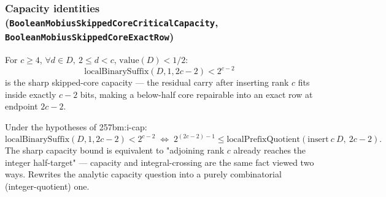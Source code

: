 \subsubsection*{Capacity identities (\texttt{BooleanMobiusSkippedCoreCriticalCapacity}, \texttt{BooleanMobiusSkippedCoreExactRow})}

\begin{defn}
For $c\ge4$, $\forall d\in D,\ 2\le d<c$, $\mathrm{value}(D)<1/2$:
\[
\mathrm{localBinarySuffix}(D,1,2c-2) < 2^{c-2}
\]
is the sharp skipped-core capacity — the residual carry after inserting rank $c$ fits inside
exactly $c-2$ bits, making a below-half core repairable into an exact row at endpoint $2c-2$.
\par\noindent{}   
\end{defn}

\begin{thm}
Under the hypotheses of 257bm:i-cap:
\[
\mathrm{localBinarySuffix}(D,1,2c-2) < 2^{c-2} \;\Longleftrightarrow\; 2^{(2c-2)-1} \le \mathrm{localPrefixQuotient}(\mathrm{insert}\ c\ D,\ 2c-2).
\]
The sharp capacity bound is equivalent to "adjoining rank $c$ already reaches the integer
half-target" — capacity and integral-crossing are the same fact viewed two ways. Rewrites the
analytic capacity question into a purely combinatorial (integer-quotient) one.
\par\noindent{}   
\end{thm}


